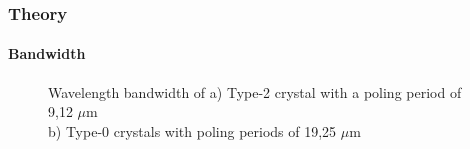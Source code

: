 \documentclass[serif,8pt]{beamer}
\begin{document}
\begin{frame}[t]
	\frametitle{Theory}
	\framesubtitle{Bandwidth}
	\begin{figure}[!ht]
	  \centering
	  \caption{Wavelength bandwidth of a) Type-2 crystal with a poling period of 9,12 $\mu$m\\ b) Type-0 crystals with poling periods of 19,25 $\mu$m}
	  \quad
	  \label{fig:CompT0a2}
	\end{figure}
\end{frame}
\end{document}
